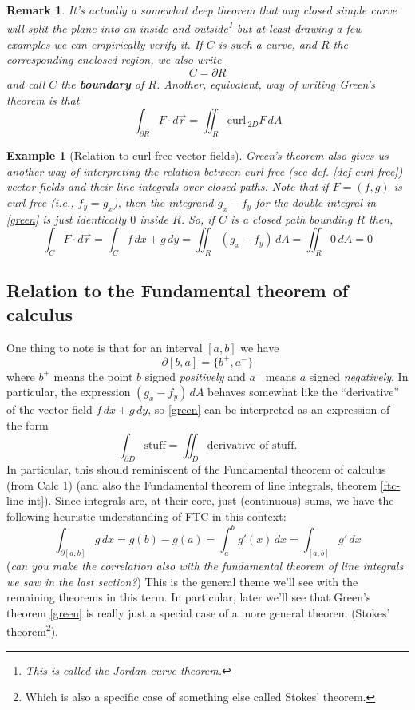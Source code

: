 \documentclass[12pt]{article}
\numberwithin{equation}{subsection}
\numberwithin{figure}{subsection}
\theoremstyle{note}
\newtheorem{example}[subsection]{Example}
\newtheorem{remark}[subsection]{Remark}
\newcommand{\curl}{\mathrm{curl\,}}
\begin{document}
{\begin{remark}It's actually a somewhat deep theorem that \textit{any} closed simple curve will split the plane into an inside and outside\footnote{This is called the \href{https://en.wikipedia.org/wiki/Jordan_curve_theorem}{Jordan curve theorem}.} but at least drawing a few examples we can empirically verify it. If $C$ is such a curve, and $R$ the corresponding enclosed region, we also write\begin{equation} C=\partial R \end{equation} and call $C$ the \textbf{boundary} of $R$. 
Another, equivalent, way of writing Green's theorem is that \[ \int_{\partial R} F\cdot d\vec{r}=\iint_R \curl_{2D} F\,dA\] 
\end{remark}
\begin{example}[Relation to curl-free vector fields]Green's theorem also gives us another way of interpreting the relation between \textit{curl-free} (see def. \ref{def-curl-free}) vector fields and their line integrals over closed paths. Note that if $F=(f,g)$ is curl free (i.e., $f_y=g_x$), then the integrand $g_x-f_y$ for the double integral in \eqref{green} is just identically $0$ inside $R$. So, if $C$ is a closed path bounding $R$ then, \begin{equation} \int_C F\cdot d\vec{r}=\int_C f\,dx+g\,dy=\iint_R (g_x-f_y)\,dA=\iint_R 0 \,dA=0\end{equation}
\end{example}

\subsection{Relation to the Fundamental theorem of calculus}One thing to note is that for an interval $[a,b]$ we have \[\partial [b,a]=\{ b^+, a^-\}\] where $b^+$ means the point $b$ signed \textit{positively} and $a^-$ means $a$ signed \textit{negatively}. In particular, the expression $(g_x-f_y)\, dA$ behaves somewhat like the ``derivative'' of the vector field $f\,dx+g\,dy$, so \eqref{green} can be interpreted as an expression of the form \[ \int_{\partial D} \text{stuff} = \iint_D \text{derivative of stuff}.\] 
In particular, this should reminiscent of the Fundamental theorem of calculus (from Calc 1) (and also the Fundamental theorem of line integrals, theorem \ref{ftc-line-int}). Since integrals are, at their core, just (continuous) sums, we have the following heuristic understanding of FTC in this context:
\[ \int_{\partial [a,b]} g\,dx =g(b)-g(a)=\int_a^b g'(x)\,dx= \int_{[a,b]}g'\,dx \]
(\textit{can you make the correlation also with the fundamental theorem of line integrals we saw in the last section?}) This is the general theme we'll see with the remaining theorems in this term. In particular, later we'll see that Green's theorem \eqref{green} is really just a special case of a more general theorem (Stokes' theorem\footnote{Which is also a specific case of something else called Stokes' theorem.}).


}
\end{document}
